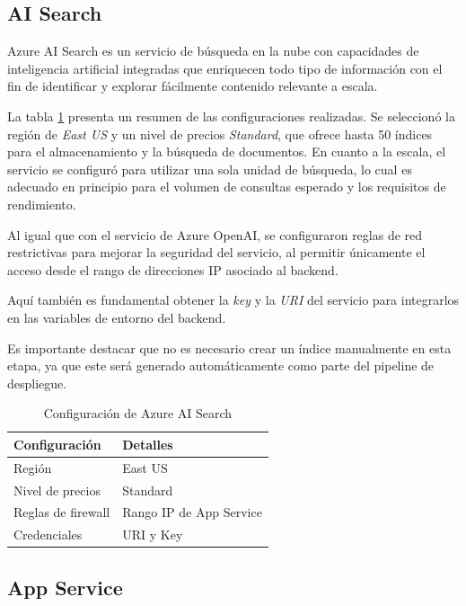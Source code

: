 \subsection{AI Search}

Azure AI Search es un servicio de búsqueda en la nube con capacidades de inteligencia artificial integradas 
que enriquecen todo tipo de información con el fin de identificar y explorar fácilmente contenido relevante a escala.

La tabla \ref{tab:config-ai-search} presenta un resumen de las configuraciones realizadas. Se seleccionó la región de \textit{East US} y un nivel de precios 
\textit{Standard}, que ofrece hasta 50 índices para el almacenamiento y la búsqueda de documentos. En cuanto a la escala, el servicio se configuró para 
utilizar una sola unidad de búsqueda, lo cual es adecuado en principio para el volumen de consultas esperado y los requisitos de rendimiento.

Al igual que con el servicio de Azure OpenAI, se configuraron reglas de red restrictivas para mejorar la seguridad del servicio, al permitir 
únicamente el acceso desde el rango de direcciones IP asociado al backend. 

Aquí también es fundamental obtener la \textit{key} y la \textit{URI} del servicio para integrarlos en las variables de entorno del backend.

Es importante destacar que no es necesario crear un índice manualmente en esta etapa, ya que este será generado automáticamente como parte del pipeline de despliegue.

\begin{table}[h]
	\centering
	\caption[Configuración de Azure AI Search]{Configuración de Azure AI Search}
	\begin{tabular}{l l}    
		\toprule
		\textbf{Configuración} 	 & \textbf{Detalles} 	\\
		\midrule
		Región              &	East US 				        \\		
		Nivel de precios    & Standard				      \\
		Reglas de firewall  & Rango IP de App Service \\
    	Credenciales	      & URI y Key 		      \\
		\bottomrule
		\hline
	\end{tabular}
	\label{tab:config-ai-search}
\end{table}

\subsection{App Service}

